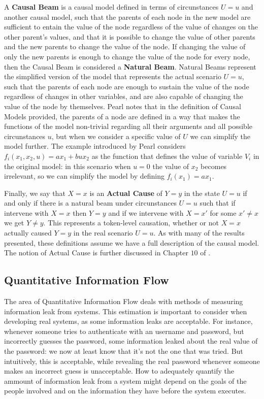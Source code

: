 A \textbf{Causal Beam} is a causal model defined in terms of circunstances $U=u$ and another causal model, such that the parents of each node in the new model are sufficient to entain the value of the node regardless of the value of changes on the other parent's values, and that it is possible to change the value of other parents and the new parents to change the value of the node. If changing the value of only the new parents is enough to change the value of the node for every node, then the Causal Beam is considered a \textbf{Natural Beam}. Natural Beams represent the simplified version of the model that represents the actual scenario $U=u$, such that the parents of each node are enough to sustain the value of the node regardless of changes in other variables, and are also capable of changing the value of the node by themselves. Pearl notes that in the definition of Causal Models provided, the parents of a node are defined in a way that makes the functions of the model non-trivial regarding all their arguments and all possible circunstances $u$, but when we consider a specific value of $U$ we can simplify the model further. The example introduced by Pearl considers $f_i(x_1,x_2,u) = ax_1+bux_2$ as the function that defines the value of variable $V_i$ in the original model: in this scenario when $u=0$ the value of $x_2$ becomes irrelevant, so we can simplify the model by defining $f_i(x_1) = ax_1$. 

Finally, we say that $X=x$ is an \textbf{Actual Cause} of $Y=y$ in the state $U=u$ if and only if there is a natural beam under circunstances $U=u$ such that if intervene with $X=x$ then $Y=y$ and if we intervene with $X=x'$ for some $x'\neq x$ we get $Y \neq y$. This represents a token-level causation, whether or not $X=x$ actually caused $Y=y$ in the real scenario $U=u$. As with many of the results presented, these definitions assume we have a full description of the causal model. The notion of Actual Cause is further discussed in Chapter $10$ of \cite{Causality}.


\subsection{Quantitative Information Flow}

The area of Quantitative Information Flow deals with methods of measuring information leak from systems. This estimation is important to consider when developing real systems, as some information leaks are acceptable. For instance, whenever someone tries to authenticate with an username and password, but incorrectly guesses the password, some information leaked about the real value of the password: we now at least know that it's not the one that was tried. But intuitively, this is acceptable, while revealing the real password whenever someone makes an incorrect guess is unacceptable. How to adequately quantify the ammount of information leak from a system might depend on the goals of the people involved and on the information they have before the system executes.

